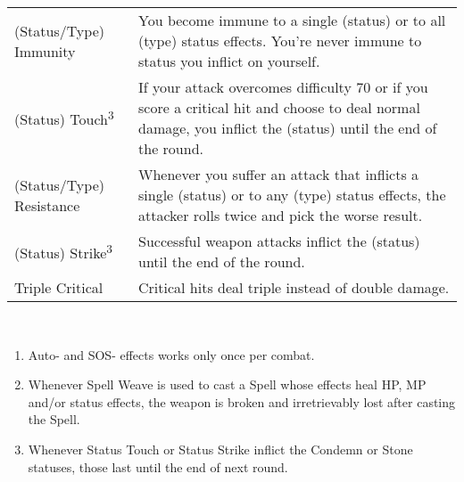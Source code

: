 \begin{table}[ht]
\begin{tabular}{p{}p{}}
        (Status/Type) Immunity & You become immune to a single (status) or to all (type) status effects. You're never immune to status you inflict on yourself. \\
        (Status) Touch\textsuperscript{3} & If your attack overcomes difficulty 70 or if you score a critical hit and choose to deal normal damage, you inflict the (status) until the end of the round. \\
        (Status/Type) Resistance & Whenever you suffer an attack that inflicts a single (status) or to any (type) status effects, the attacker rolls twice and pick the worse result. \\
        (Status) Strike\textsuperscript{3} & Successful weapon attacks inflict the (status) until the end of the round. \\
        Triple Critical & Critical hits deal triple instead of double damage. \\ \bottomrule
        \end{tabular} \\
\end{table}
\begin{footnotesize}
\begin{enumerate}
    \item Auto- and SOS- effects works only once per combat.
    \item Whenever Spell Weave is used to cast a Spell whose effects heal HP, MP and/or status effects, the weapon is broken and irretrievably lost after casting the Spell.
    \item Whenever Status Touch or Status Strike inflict the Condemn or Stone statuses, those last until the end of next round.
\end{enumerate}
\end{footnotesize}